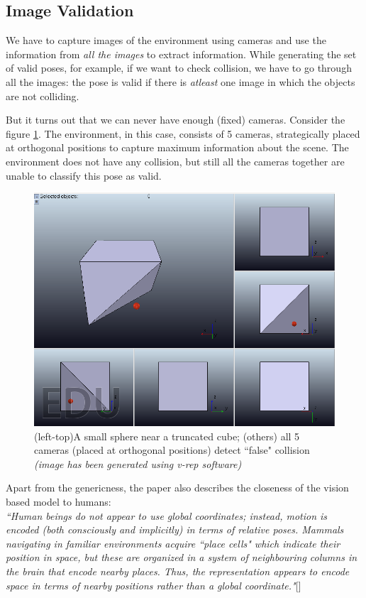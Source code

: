 \documentclass[12pt, two column]{article}
\begin{document}
\subsection{Image Validation}
We have to capture images of the environment using cameras and use the information from \textit{all the images} to extract information. While generating the set of valid poses, for example, if we want to check collision, we have to go through all the images: the pose is valid if there is \textit{atleast} one image in which the objects are not colliding.

But it turns out that we can never have enough (fixed) cameras. Consider the figure \ref{difficulties}. The environment, in this case, consists of 5 cameras, strategically placed at orthogonal positions to capture maximum information about the scene. The environment does not have any collision, but still all the cameras together are unable to classify this pose as valid.\\
\begin{figure}
  \includegraphics[width=\columnwidth]{graphics/difficulties}
  \caption{(left-top)A small sphere near a truncated cube; (others) all 5 cameras (placed at orthogonal positions) detect ``false" collision \textit{\small{(image has been generated using v-rep software)}}}
  \label{difficulties}
\end{figure}

Apart from the genericness, the paper also describes the closeness of the vision based model to humans:\\
\textit{``Human beings do not appear to use global coordinates; instead, motion is encoded (both consciously and implicitly) in terms of relative poses. Mammals navigating in familiar environments acquire ``place cells" which indicate their position in space, but these are organized in a system of neighbouring columns in the brain that encode nearby places. Thus, the representation appears to encode space in terms of nearby positions rather than a global coordinate."}[\cite{deb}]
\end{document}
